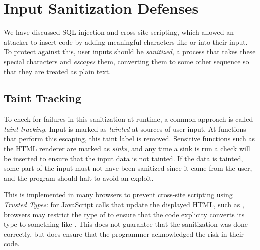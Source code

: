 \section{Input Sanitization Defenses}
We have discussed SQL injection and cross-site scripting, which allowed an attacker to insert code by adding meaningful characters like  or \ttt{>}into their input. To protect against this, user inputs should be \emph{sanitized}, a process that takes these special characters and \emph{escapes} them, converting them to some other sequence so that they are treated as plain text. 

\subsection{Taint Tracking}
To check for failures in this sanitization at runtime, a common approach is called \emph{taint tracking}. Input is marked as \emph{tainted} at sources of user input. At functions that perform this escaping, this taint label is removed. Sensitive functions such as the HTML renderer are marked as \emph{sinks}, and any time a sink is run a check will be inserted to ensure that the input data is not tainted. If the data is tainted, some part of the input must not have been sanitized since it came from the user, and the program should halt to avoid an exploit.

This is implemented in many browsers to prevent cross-site scripting using \emph{Trusted Types}: for JavaScript calls that update the displayed HTML, such as , browsers may restrict the type of  to ensure that the code explicity converts its type to something like . This does not guarantee that the sanitization was done correctly, but does ensure that the programmer acknowledged the risk in their code.
